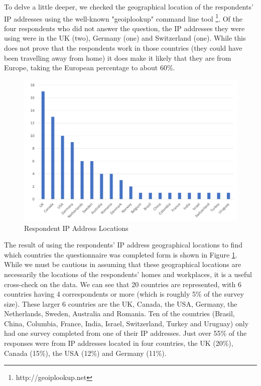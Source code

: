 To delve a little deeper, we checked the geographical location of the respondents' IP addresses using the well-known "geoiplookup" command line tool \footnote{http://geoiplookup.net}.  Of the four respondents who did not answer the question, the IP addresses they were using were in the UK (two), Germany (one) and Switzerland (one).  While this does not prove that the respondents work in those countries (they could have been travelling away from home) it does make it likely that they are from Europe, taking the European percentage to about 60\%.
 
\begin{figure}
\centering
\includegraphics[width=12cm,trim={2 2 2 2},clip]{Figures/prioritisation-iplocation}
\caption{Respondent IP Address Locations}
\label{figure:iplocations}
\end{figure}

The result of using the respondents' IP address geographical locations to find which countries the questionnaire was completed form is shown in Figure \ref{figure:iplocations}.  While we must be cautious in assuming that these geographical locations are necessarily the locations of the respondents' homes and workplaces, it is a useful cross-check on the data.  We can see that 20 countries are represented, with 6 countries having 4 correspondents or more (which is roughly 5\% of the survey size).  These larger 6 countries are the UK, Canada, the USA, Germany, the Netherlands, Sweden, Australia and Romania.  Ten of the countries (Brasil, China, Columbia, France, India, Israel, Switzerland, Turkey and Uruguay) only had one survey completed from one of their IP addresses.  Just over 55\% of the responses were from IP addresses located in four countries, the UK (20\%), Canada (15\%), the USA (12\%) and Germany (11\%).

